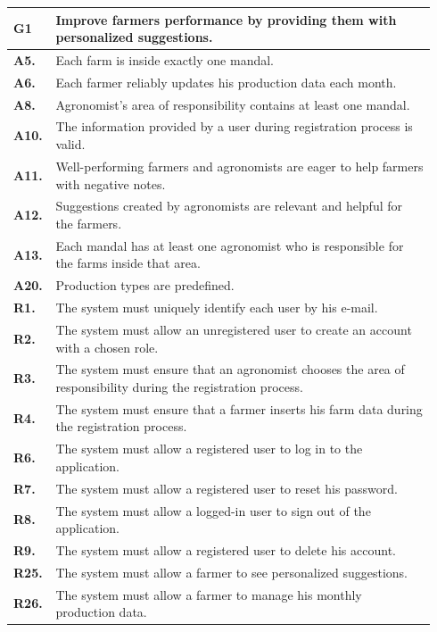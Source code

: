 \begin{longtable}{p{0.06\linewidth} p{0.88\linewidth}} 
    \toprule
    \textbf{G1} & Improve farmers performance by providing them with personalized suggestions. \\
    \midrule
    \textbf{A5.} & Each farm is inside exactly one mandal.\\ 
    \textbf{A6.} & Each farmer reliably updates his production data each month.\\ 
    \textbf{A8.} & Agronomist's area of responsibility contains at least one mandal.\\ 
    \textbf{A10.} & The information provided by a user during registration process is valid.\\ 
    \textbf{A11.} & Well-performing farmers and agronomists are eager to help farmers with negative notes.\\ 
    \textbf{A12.} & Suggestions created by agronomists are relevant and helpful for the farmers. \\
    \textbf{A13.} & Each mandal has at least one agronomist who is responsible for the farms inside that area.\\ 
    \textbf{A20.} & Production types are predefined.\\
     
    \midrule		
	\textbf{R1.} & The system must uniquely identify each user by his e-mail. \\
	\textbf{R2.} & The system must allow an unregistered user to create an account with a chosen role. \\
	\textbf{R3.} & The system must ensure that an agronomist chooses the area of responsibility during the registration process. \\
	\textbf{R4.} & The system must ensure that a farmer inserts his farm data during the registration process.\\
	\textbf{R6.} & The system must allow a registered user to log in to the application. \\
	\textbf{R7.} & The system must allow a registered user to reset his password. \\
	\textbf{R8.} & The system must allow a logged-in user to sign out of the application. \\
	\textbf{R9.} & The system must allow a registered user to delete his account. \\
	
	\textbf{R25.} & The system must allow a farmer to see personalized suggestions.\\
	\textbf{R26.} & The system must allow a farmer to manage his monthly production data.\\
	

\end{longtable}
